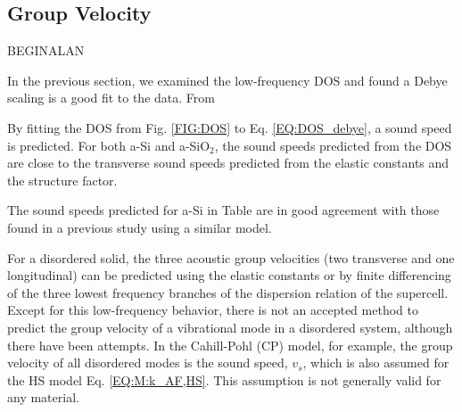 \documentclass[aps,prb,onecolumn,preprint,superscriptaddress,footinbib,amsmath,amssymb,floatfix]{revtex4}
\begin{document}
\subsection{\label{S:Structure}Group Velocity}

BEGINALAN

In the previous section, we examined the low-frequency DOS and found 
a Debye scaling is a good fit to the data.  From

By fitting the DOS 
from Fig. \ref{FIG:DOS} to Eq. \eqref{EQ:DOS_debye},
a sound speed is predicted. 
For both a-Si and a-SiO$_2$, the sound speeds predicted from the DOS 
are close to the transverse sound speeds predicted from the elastic 
constants and the structure factor.

The sound speeds predicted for a-Si in Table are in good agreement 
with those found in a previous study using a similar 
model.\cite{feldman_thermal_1993,feldman_numerical_1999} 

For a disordered solid, the three acoustic group 
velocities (two transverse and one 
longitudinal) can be predicted using the elastic constants
\cite{gale_general_2003} 
or by finite differencing of the three lowest frequency branches 
of the dispersion relation of the supercell.
\cite{feldman_thermal_1993,feldman_numerical_1999,
donadio_atomistic_2009,he_thermal_2011,
he_heat_2011,hori_phonon_2013,larkin_predicting_2013} 
Except for this low-frequency behavior, there is not an 
accepted method to predict the group velocity of a 
vibrational mode in a disordered system, although there have been 
attempts.
\cite{cahill_lattice_1988,duda_reducing_2011,donadio_atomistic_2009,
he_heat_2011,he_thermal_2011} 
In the Cahill-Pohl (CP) model, for example, the group velocity of 
all disordered modes is the sound speed, $v_s$, which is also assumed  
for the HS model Eq. \eqref{EQ:M:k_AF,HS}.
\cite{cahill_lattice_1988} This assumption is not generally valid  
for any material.\cite{feldman_numerical_1999,duda_reducing_2011,
donadio_atomistic_2009,he_heat_2011,he_thermal_2011,larkin_predicting_2013}

\end{document}
